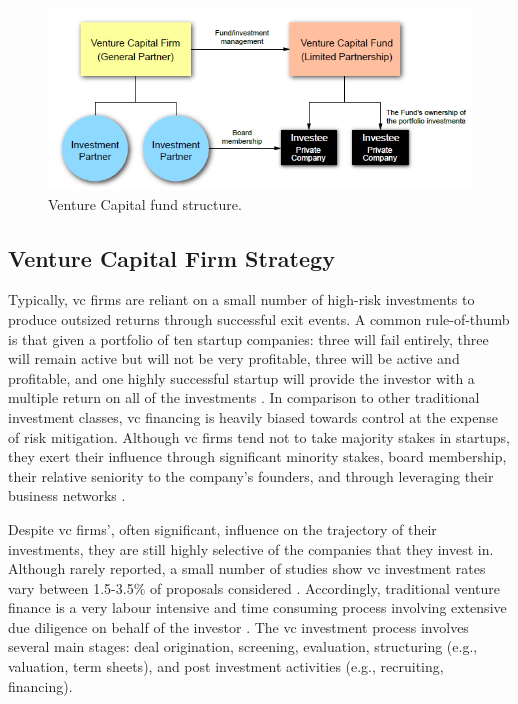 \documentclass[../thesis/thesis.tex]{subfiles}
\begin{document}
\begin{figure}[!htb]
    \centering
    \includegraphics{../figures/litreview/fund_structure.png}
    \caption[Venture Capital fund structure]{Venture Capital fund structure.}
    \label{fig:litreview:criteria:fund_structure}
\end{figure}

\subsection{Venture Capital Firm Strategy}

Typically, \gls{vc} firms are reliant on a small number of high-risk investments to produce outsized returns through successful exit events. A common rule-of-thumb is that given a portfolio of ten startup companies: three will fail entirely, three will remain active but will not be very profitable, three will be active and profitable, and one highly successful startup will provide the investor with a multiple return on all of the investments \cite{stone2014}. In comparison to other traditional investment classes, \gls{vc} financing is heavily biased towards control at the expense of risk mitigation. Although \gls{vc} firms tend not to take majority stakes in startups, they exert their influence through significant minority stakes, board membership, their relative seniority to the company’s founders, and through leveraging their business networks \cite{fried2006}.

Despite \gls{vc} firms’, often significant, influence on the trajectory of their investments, they are still highly selective of the companies that they invest in. Although rarely reported, a small number of studies show \gls{vc} investment rates vary between 1.5-3.5\% of proposals considered \cite{stone2014}. Accordingly, traditional venture finance is a very labour intensive and time consuming process involving extensive due diligence on behalf of the investor \cite{fried1994}. The \gls{vc} investment process involves several main stages: deal origination, screening, evaluation, structuring (e.g., valuation, term sheets), and post investment activities (e.g., recruiting, financing).
\end{document}
